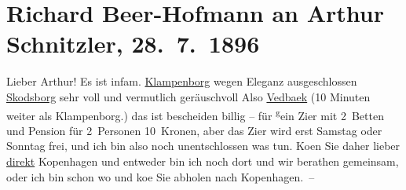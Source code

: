 

         
         \renewcommand{\erwaehntePersonen}{Personen: Georg Brandes, Paul Goldmann}
         \renewcommand{\erwaehnteOrte}{Orte: Hotel König von Dänemark, Klampenborg, Kopenhagen, Skodsborg, Vedbæk}
         \renewcommand{\erwaehnteWerke}{}
               \section[Richard Beer-Hofmann an Arthur Schnitzler, 28. 7. 1896]{ Richard Beer-Hofmann an Arthur Schnitzler, 28. 7. 1896}\nopagebreak{}\rehead{ }\begin{ledgroupsized}[t]{13cm}\normalsize\beginnumbering \toendnotes[C]{\smallbreak\pagebreak[2]} 
\pstart
           \noindent{}{\pb}Lieber Arthur! Es ist
               infam.\pend
           \pstart
           \uline{Klampenborg} wegen Eleganz ausgeschlossen\pend
           \pstart
           \uline{Skodsborg} sehr voll und vermutlich geräuschvoll\pend
           \pstart
           Also \uline{Vedbaek} (10 Minuten weiter als Klampenborg.)\pend
           \pstart
           das ist bescheiden billig – für \substVorne{}\textsuperscript{g}\substDazwischen{}e\substHinten{}in Zi{\geminationm}er mit 2 Betten und Pension für 2 Personen
               10 Kronen, aber das Zi{\geminationm}er wird erst {\pb}Samstag oder Sonntag frei, und ich bin also noch
               unentschlossen was tun. Ko{\geminationm}en Sie daher lieber \uline{direkt}{ }Kopenhagen und entweder bin ich noch dort und
               wir berathen gemeinsam, oder ich bin schon wo und ko{\geminationm}e
               Sie abholen nach Kopenhagen. –\pend

\end{ledgroupsized}
